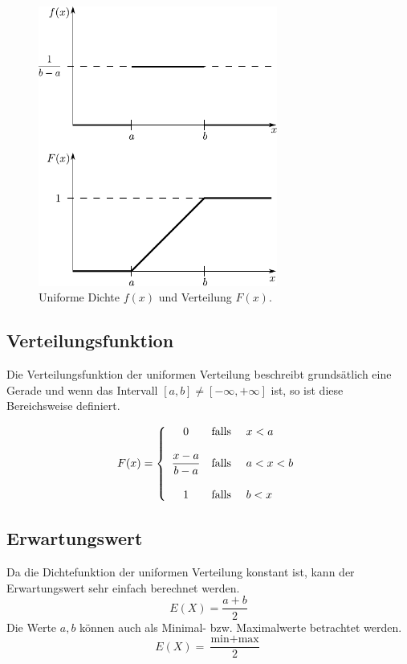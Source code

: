 \begin{figure}[h!]
	\centering
	\includegraphics[width=0.7\textwidth]{uniform.pdf}
	\caption{Uniforme Dichte $f(x)$ und Verteilung $F(x)$.}
	\label{fig:uniform}
\end{figure}

\subsection{Verteilungsfunktion}
Die Verteilungsfunktion der uniformen Verteilung beschreibt
grundsätlich eine Gerade und wenn das Intervall 
$[a,b]\neq[-\infty, +\infty]$ ist, so ist diese Bereichsweise
definiert.

\[  
	F(x) = \left\{
		\begin{array}{c c l}
			0 
				& \text{falls } 
				& x < a \\
			& \\
			\displaystyle
			\frac{x-a}{b-a} 
				& \text{falls } 
				& a < x < b \\
			& \\
			1
				& \text{falls } 
				& b < x
		\end{array} \right.
\]

\subsection{Erwartungswert}
Da die Dichtefunktion der uniformen Verteilung konstant ist,
kann der Erwartungswert sehr einfach berechnet werden.
\[  
	E(X) = \frac{a+b}{2}
\]
Die Werte $a,b$ können auch als Minimal- bzw. Maximalwerte
betrachtet werden.
\[  
E(X) = \frac{\text{min} + \text{max}}{2}
\]

